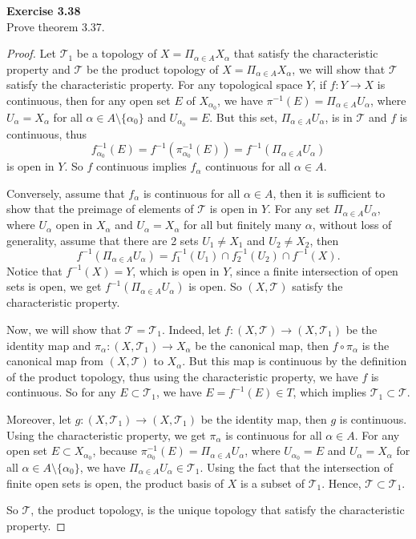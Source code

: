 \documentclass[12pt, a4paper]{article}
\theoremstyle{plain}
\newcommand{\T}{\mathcal{T}}
\newenvironment{exercise}[2][Exercise]
    { \begin{mdframed}[backgroundcolor=gray!20] \textbf{#1 #2} \\}
    {  \end{mdframed}}
\begin{document}
\begin{exercise}{3.38}
Prove theorem 3.37.
\end{exercise}
	\begin{proof}
	Let $\T_1$ be a topology of $X = \Pi_{\alpha\in A}X_\alpha$ that satisfy the characteristic property and $\T$ be the product topology of $X = \Pi_{\alpha\in A}X_\alpha$, we will show that $\T$ satisfy the characteristic property. For any topological space $Y$, if $f:Y\rightarrow X$ is continuous, then for any open set $E$ of $X_{\alpha_0}$, we have $\pi^{-1}(E)=\Pi_{\alpha\in A}U_\alpha$, where $U_\alpha = X_\alpha$ for all $\alpha\in A\setminus\{\alpha_0\}$ and $U_{\alpha_0}=E$. But this set, $\Pi_{\alpha\in A}U_\alpha$, is in $\T$ and $f$ is continuous, thus 
	\[
	f_{\alpha_0}^{-1}(E)=f^{-1}(\pi_{\alpha_0}^{-1}(E))=f^{-1}(\Pi_{\alpha\in A}U_\alpha)
	\]	
	is open in $Y$. So $f$ continuous implies $f_\alpha$ continuous for all $\alpha\in A$.
	
	Conversely, assume that $f_\alpha$ is continuous for all $\alpha\in A$, then it is sufficient to show that the preimage of elements of $\T$ is open in $Y$. For any set $\Pi_{\alpha\in A}U_\alpha$, where $U_\alpha$ open in $X_\alpha$ and $U_\alpha = X_\alpha$ for all but finitely many $\alpha$, without loss of generality, assume that there are 2 sets $U_1\neq X_1$ and $U_2\neq X_2$, then
	\[
	f^{-1}(\Pi_{\alpha\in A}U_\alpha)=f_1^{-1}(U_1)\cap f_2^{-1}(U_2)\cap f^{-1}(X).
	\]
	Notice that $f^{-1}(X)=Y$, which is open in $Y$, since a finite intersection of open sets is open, we get $f^{-1}(\Pi_{\alpha\in A}U_\alpha)$ is open. So $(X,\T)$ satisfy the characteristic property.
	
	Now, we will show that $\T=\T_1$. Indeed, let $f:(X,\T)\rightarrow (X,\T_1)$ be the identity map and $\pi_\alpha:(X,\T_1)\rightarrow X_\alpha$ be the canonical map, then $f\circ \pi_\alpha$ is the canonical map from $(X,\T)$ to $X_\alpha$. But this map is continuous by the definition of the product topology, thus using the characteristic property, we have $f$ is continuous. So for any $E\subset \T_1$, we have $E=f^{-1}(E)\in T$, which implies $\T_1\subset \T$.
	
	Moreover, let $g:(X,\T_1)\rightarrow (X,\T_1)$ be the identity map, then $g$ is continuous. Using the characteristic property, we get $\pi_\alpha$ is continuous for all $\alpha\in A$. For any open set $E\subset X_{\alpha_0}$, because $\pi_{\alpha_0}^{-1}(E)=\Pi_{\alpha\in A}U_\alpha$, where $U_{\alpha_0}=E$ and $U_\alpha = X_\alpha$ for all $\alpha\in A\setminus\{\alpha_0\}$, we have $\Pi_{\alpha\in A}U_\alpha\in\T_1$. Using the fact that the intersection of finite open sets is open, the product basis of $X$ is a subset of $\T_1$. Hence, $\T\subset \T_1$.
	
	So $\T$, the product topology, is the unique topology that satisfy the characteristic property.
	\end{proof}
	
\end{document}
